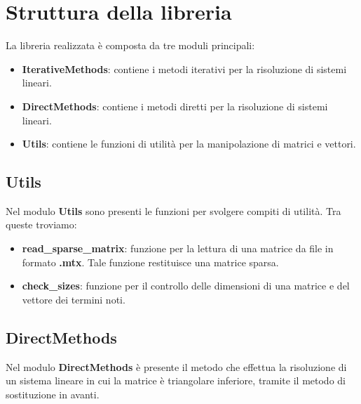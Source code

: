 \section{Struttura della libreria}
La libreria realizzata è composta da tre moduli principali:
\begin{itemize}
    \item \textbf{IterativeMethods}: contiene i metodi iterativi per la risoluzione
          di sistemi lineari.
    \item \textbf{DirectMethods}: contiene i metodi diretti per la risoluzione
          di sistemi lineari.
    \item \textbf{Utils}: contiene le funzioni di utilità per la manipolazione
          di matrici e vettori.
\end{itemize}

\subsection{Utils}
Nel modulo \textbf{Utils} sono presenti le funzioni per svolgere compiti di
utilità. Tra queste troviamo:
\begin{itemize}
    \item \textbf{read\_sparse\_matrix}: funzione per la lettura di una matrice
          da file in formato \textbf{.mtx}. Tale funzione restituisce una matrice
          sparsa.
    \item \textbf{check\_sizes}: funzione per il controllo delle dimensioni di
          una matrice e del vettore dei termini noti.
\end{itemize}
\subsection{DirectMethods}
Nel modulo \textbf{DirectMethods} è presente il metodo che effettua la risoluzione
di un sistema lineare in cui la matrice è triangolare inferiore, tramite il
metodo di sostituzione in avanti.

